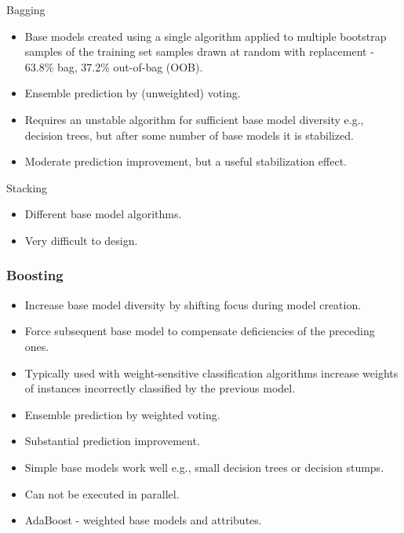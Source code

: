 \documentclass{beamer}
\begin{document}
\begin{frame}
\begin{block}{Bagging}
\begin{itemize}
\item Base models created using a single algorithm applied to multiple bootstrap samples of the training set samples drawn at random with replacement - 63.8\% bag, 37.2\% out-of-bag (OOB).
\item Ensemble prediction by (unweighted) voting.
\item Requires an unstable algorithm for sufficient base model diversity e.g., decision trees, but after some number of base models it is stabilized.
\item Moderate prediction improvement, but a useful stabilization effect.
\end{itemize}
\end{block}
\begin{block}{Stacking}
\begin{itemize}
\item Different base model algorithms.
\item Very difficult to design.
\end{itemize}
\end{block}
\end{frame}

\begin{frame}
\frametitle{Boosting}
\begin{block}{}
\begin{itemize}
\item Increase base model diversity by shifting focus during model creation.
\item Force subsequent base model to compensate deficiencies of the preceding ones.
\item Typically used with weight-sensitive classification algorithms increase weights of instances incorrectly classified by the previous model.
\item Ensemble prediction by weighted voting.
\item Substantial prediction improvement.
\item Simple base models work well e.g., small decision trees or decision stumps.
\item Can not be executed in parallel.
\item AdaBoost - weighted base models and attributes.
\end{itemize}
\end{block}
\end{frame}
\end{document}

